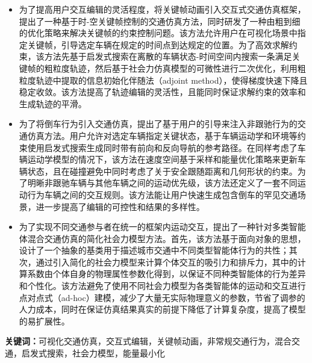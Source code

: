 \begin{itemize}
    \item 为了提高用户交互编辑的灵活程度，将关键帧动画引入交互式交通仿真框架，提出了一种基于时-空关键帧控制的交通仿真方法，同时研发了一种由粗到细的优化策略来解决关键帧的约束控制问题。该方法允许用户在可视化场景中指定关键帧，引导选定车辆在规定的时间点到达规定的位置。为了高效求解约束，该方法先基于启发式搜索在离散的车辆状态-时间空间内搜索一条满足关键帧的粗粒度轨迹，然后基于社会力仿真模型的可微性进行二次优化，利用粗粒度轨迹中提取的信息初始化伴随法（adjoint method），使得梯度快速下降且稳定收敛。该方法提高了轨迹编辑的灵活性，且能同时保证求解约束的效率和生成轨迹的平滑。

    \item 为了将倒车行为引入交通仿真，提出了基于用户的引导来注入非跟驰行为的交通仿真方法。用户允许对选定车辆指定关键状态，基于车辆运动学和环境等约束使用启发式搜索生成同时带有前向和反向导航的参考路径。在同样考虑了车辆运动学模型的情况下，该方法在速度空间基于采样和能量优化策略来更新车辆状态，且在碰撞避免中同时考虑了关于安全跟随距离和几何形状的约束。为了明晰非跟驰车辆与其他车辆之间的运动优先级，该方法还定义了一套不同运动行为车辆之间的交互规则。该方法能让用户快速生成包含倒车的罕见交通场景，进一步提高了编辑的可控性和结果的多样性。

    \item 为了实现不同交通参与者在统一的框架内运动交互，提出了一种针对多类智能体混合交通仿真的简化社会力模型方法。首先，该方法基于面向对象的思想，设计了一个抽象的基类用于描述城市交通中不同类型智能体行为的共性；其次，通过引入简化的社会力模型来计算个体交互的吸引力和排斥力，其中的计算系数由个体自身的物理属性参数化得到，以保证不同种类智能体的行为差异和个性化。该方法避免了使用不同社会力模型为各类智能体的运动和交互进行点对点式（ad-hoc）建模，减少了大量无实际物理意义的参数，节省了调参的人力成本，同时在保证仿真结果真实的前提下降低了计算复杂度，提高了模型的易扩展性。
    

\end{itemize}

\noindent\textbf{关键词：}可视化交通仿真，交互式编辑，关键帧动画，非常规交通行为，混合交通，启发式搜索，社会力模型，能量最小化


\cleardoublepage
{}

